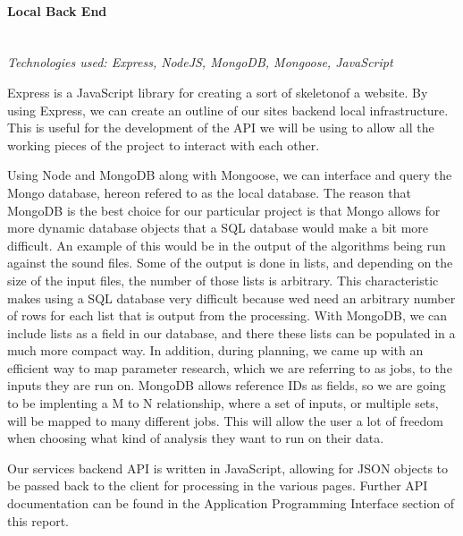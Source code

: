 \paragraph{Local Back End} \mbox{}\\
\textit{Technologies used: Express, NodeJS, MongoDB, Mongoose, JavaScript}\par
Express is a JavaScript library for creating a sort of \textquotesingle skeleton\textquotesingle of a website. By using Express, we can create an outline of our site\textquotesingle s backend local infrastructure. This is useful for the development of the API we will be using to allow all the working pieces of the project to interact with each other.\par
Using Node and MongoDB along with Mongoose, we can interface and query the Mongo database, hereon refered to as the local database. The reason that MongoDB is the best choice for our particular project is that Mongo allows for more dynamic database objects that a SQL database would make a bit more difficult. An example of this would be in the output of the algorithms being run against the sound files. Some of the output is done in lists, and depending on the size of the input files, the number of those lists is arbitrary. This characteristic makes using a SQL database very difficult because we\textquotesingle d need an arbitrary number of rows for each list that is output from the processing. With MongoDB, we can include lists as a field in our database, and there these lists can be populated in a much more compact way. In addition, during planning, we came up with an efficient way to map parameter research, which we are referring to as jobs, to the inputs they are run on. MongoDB allows reference IDs as fields, so we are going to be implenting a M to N relationship, where a set of inputs, or multiple sets, will be mapped to many different jobs. This will allow the user a lot of freedom when choosing what kind of analysis they want to run on their data.\par
Our service\textquotesingle s backend API is written in JavaScript, allowing for JSON objects to be passed back to the client for processing in the various pages. Further API documentation can be found in the Application Programming Interface section of this report.

